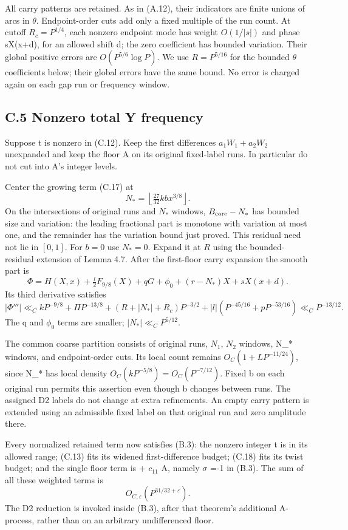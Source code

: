 \documentclass[11pt,a4paper]{article}
\begin{document}
All carry patterns are retained. As in (A.12), their indicators are
finite unions of arcs in \(\theta\). Endpoint-order cuts add only a
fixed multiple of the run count. At cutoff \(R_c=P^{1/4}\), each nonzero
endpoint mode has weight \(O(1/|s|)\) and phase sX(x+d), for an allowed
shift d; the zero coefficient has bounded variation. Their global
positive errors are \(O(P^{5/6}\log P)\). We use \(R=P^{5/16}\) for the
bounded \(\theta\) coefficients below; their global errors have the same
bound. No error is charged again on each gap run or frequency window.

\subsection{C.5 Nonzero total Y
frequency}\label{c.5-nonzero-total-y-frequency}

Suppose t is nonzero in (C.12). Keep the first differences
\(a_1W_1+a_2W_2\) unexpanded and keep the floor A on its original
fixed-label runs. In particular do not cut into A's integer levels.

Center the growing term (C.17) at \[
N_*=\left\lfloor\tfrac{27}{32}kb x^{3/8}\right\rfloor .
\] On the intersections of original runs and \(N_*\) windows,
\(B_{\rm core}-N_*\) has bounded size and variation: the leading
fractional part is monotone with variation at most one, and the
remainder has the variation bound just proved. This residual need not
lie in \([0,1]\). For \(b=0\) use \(N_*=0\). Expand it at \(R\) using
the bounded-residual extension of Lemma 4.7. After the first-floor carry
expansion the smooth part is \[
\Phi=H(X,x)+\tfrac l2F_{9/8}(X)+qG+\phi_0
+(r-N_*)X+sX(x+d).
\] Its third derivative satisfies \[
|\Phi'''|\ll_C
kP^{-9/8}+\Pi P^{-13/8}
+(R+|N_*|+R_c)P^{-3/2}
+|l|(P^{-45/16}+pP^{-53/16})
\ll_C P^{-13/12}. \tag{C.18}
\] The q and \(\phi_0\) terms are smaller; \(|N_*|\ll_C P^{5/12}\).

The common coarse partition consists of original runs, \(N_1\), \(N_2\)
windows, N\_* windows, and endpoint-order cuts. Its local count remains
\(O_C(1+LP^{-11/24})\), since N\_* has local density
\(O_C(kP^{-5/8})=O_C(P^{-7/12})\). Fixed b on each original run permits
this assertion even though b changes between runs. The assigned D2
labels do not change at extra refinements. An empty carry pattern is
extended using an admissible fixed label on that original run and zero
amplitude there.

Every normalized retained term now satisfies (B.3): the nonzero integer
t is in its allowed range; (C.13) fits its widened first-difference
budget; (C.18) fits its twist budget; and the single floor term is +
\(c_{11}\) A, namely \(\sigma\) =-1 in (B.3). The sum of all these
weighted terms is \[
O_{C,\varepsilon}(P^{31/32+\varepsilon}). \tag{C.19}
\] The D2 reduction is invoked inside (B.3), after that theorem's
additional A-process, rather than on an arbitrary undifferenced floor.
\end{document}
